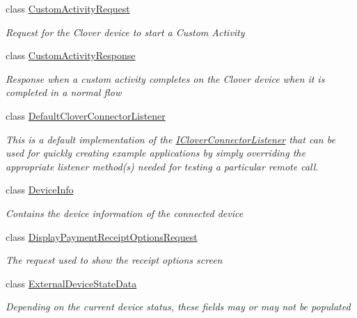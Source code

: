 \begin{DoxyCompactItemize}
class \hyperlink{classcom_1_1clover_1_1remotepay_1_1sdk_1_1_custom_activity_request}{Custom\+Activity\+Request}
\begin{DoxyCompactList}\small\item\em Request for the Clover device to start a Custom Activity \end{DoxyCompactList}\item 
class \hyperlink{classcom_1_1clover_1_1remotepay_1_1sdk_1_1_custom_activity_response}{Custom\+Activity\+Response}
\begin{DoxyCompactList}\small\item\em Response when a custom activity completes on the Clover device when it is completed in a normal flow \end{DoxyCompactList}\item 
class \hyperlink{classcom_1_1clover_1_1remotepay_1_1sdk_1_1_default_clover_connector_listener}{Default\+Clover\+Connector\+Listener}
\begin{DoxyCompactList}\small\item\em This is a default implementation of the \hyperlink{interfacecom_1_1clover_1_1remotepay_1_1sdk_1_1_i_clover_connector_listener}{I\+Clover\+Connector\+Listener} that can be used for quickly creating example applications by simply overriding the appropriate listener method(s) needed for testing a particular remote call. \end{DoxyCompactList}\item 
class \hyperlink{classcom_1_1clover_1_1remotepay_1_1sdk_1_1_device_info}{Device\+Info}
\begin{DoxyCompactList}\small\item\em Contains the device information of the connected device \end{DoxyCompactList}\item 
class \hyperlink{classcom_1_1clover_1_1remotepay_1_1sdk_1_1_display_payment_receipt_options_request}{Display\+Payment\+Receipt\+Options\+Request}
\begin{DoxyCompactList}\small\item\em The request used to show the receipt options screen \end{DoxyCompactList}\item 
class \hyperlink{classcom_1_1clover_1_1remotepay_1_1sdk_1_1_external_device_state_data}{External\+Device\+State\+Data}
\begin{DoxyCompactList}\small\item\em Depending on the current device status, these fields may or may not be populated \end{DoxyCompactList}\item 

\end{DoxyCompactItemize}
